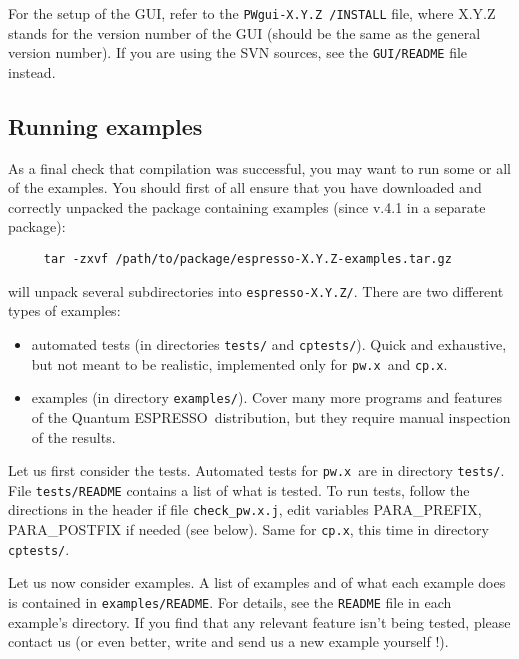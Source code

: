 \documentclass[12pt,a4paper]{article}
\def\qe{{\sc Quantum ESPRESSO}}
\def\pwx{\texttt{pw.x}}
\def\cpx{\texttt{cp.x}}
\begin{document}
For the setup of the GUI, refer to the \texttt{PWgui-X.Y.Z /INSTALL} file, where
X.Y.Z stands for the version number of the GUI (should be the same as the
general version number). If you are using the SVN sources, see
the \texttt{GUI/README} file instead.
   
\subsection{Running examples}
\label{SubSec:Examples}
As a final check that compilation was successful, you may want to run some or
all of the examples. You should first of all ensure that you have downloaded 
and correctly unpacked the package containing examples (since v.4.1 in a
separate package):
\begin{verbatim}
     tar -zxvf /path/to/package/espresso-X.Y.Z-examples.tar.gz
\end{verbatim}
will unpack several subdirectories into \texttt{espresso-X.Y.Z/}.
There are two different types of examples: 
\begin{itemize}
\item automated tests (in directories \texttt{tests/} 
and \texttt{cptests/}). Quick and exhaustive, but not
meant to be realistic, implemented only for \pwx\ and \cpx.
\item examples (in directory \texttt{examples/}).
Cover many more programs and features of the \qe\ distribution,
but they require manual inspection of the results. 
\end{itemize}

Let us first consider the tests. Automated tests for \pwx\ are in directory 
\texttt{tests/}. File \texttt{tests/README} contains a list of what is tested.
To run tests, follow the directions in the header if file 
\texttt{check\_pw.x.j}, edit variables PARA\_PREFIX, PARA\_POSTFIX 
if needed (see below). Same for \cpx, this time in directory 
\texttt{cptests/}.

Let us now consider examples. A list of examples and of what each example
does is contained in \texttt{examples/README}. 
For details, see the \texttt{README} file in each example's directory. 
If you find that any relevant feature isn't being tested, please contact us 
(or even better, write and send us a new example yourself !).
\end{document}
